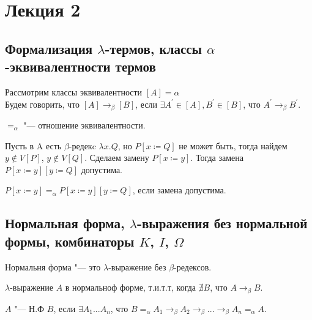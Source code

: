 \section{Лекция 2}

\subsection{Формализация $\lambda$-термов, классы $\alpha$-эквивалентности термов}

\begin{definition}
	Рассмотрим классы эквивалентности $[A]={\alpha}$ \\
	Будем говорить, что $[A]\to_{\beta}[B]$, если $\exists A^{'}\in [A], B^{'} \in [B]$, что $A^{'}\to_{\beta}B^{'}$.
\end{definition}

\begin{lemma}
	$=_{\alpha}$ "--- отношение эквивалентности.
\end{lemma}

Пусть в A есть $\beta$-редекc $\lambda{}x.Q$, но $P[x\coloneqq{}Q]$ не может быть,
тогда найдем $y\notin V[P]$, $y\notin V[Q]$. Сделаем замену $P[x\coloneqq{}y]$.
Тогда замена $P[x\coloneqq{}y][y\coloneqq{}Q]$ допустима.

\begin{lemma}
	$P[x\coloneqq{}y]=_{\alpha}P[x\coloneqq{}y][y\coloneqq{}Q]$, если замена допустима.
\end{lemma}

\subsection{Нормальная форма, $\lambda$-выражения без нормальной формы, комбинаторы $K$, $I$, $\Omega$}

\begin{definition}
	Нормальня форма "--- это $\lambda$-выражение без $\beta$-редексов.
\end{definition}

\begin{lemma}
	$\lambda$-выражение $A$ в нормальноф форме, т.и.т.т, когда $\nexists{}B$, что $A\to_{\beta}B$.
\end{lemma}

\begin{definition}
	$A$ "--- Н.Ф $B$, если $\exists A_{1}...A_{n}$, что $B=_{\alpha}A_{1}\to_{\beta}A_{2}\to_{\beta}...\to_{\beta}A_{n}=_{\alpha}A$.
\end{definition}

